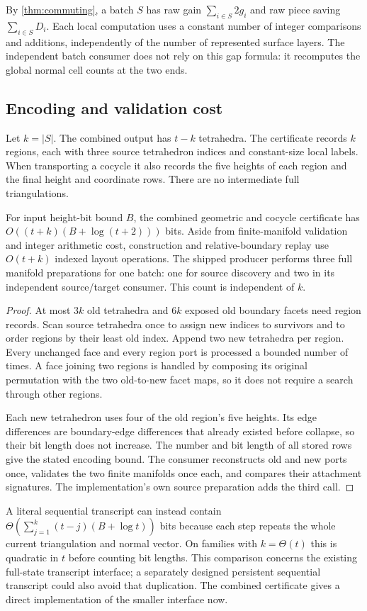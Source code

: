 By \cref{thm:commuting}, a batch $S$ has raw gain
$\sum_{i\in S}2g_i$ and raw piece saving $\sum_{i\in S}D_i$.
Each local computation uses a constant number of integer comparisons
and additions, independently of the number of represented surface
layers. The independent batch consumer does not rely on this gap
formula: it recomputes the global normal cell counts at the two ends.

\subsection{Encoding and validation cost}

Let $k=|S|$. The combined output has $t-k$ tetrahedra. The certificate
records $k$ regions, each with three source tetrahedron indices and
constant-size local labels. When transporting a cocycle it also records
the five heights of each region and the final height and coordinate
rows. There are no intermediate full triangulations.

\begin{proposition}
\label{prop:batch-cost}
For input height-bit bound $B$, the combined geometric and cocycle
certificate has $O((t+k)(B+\log(t+2)))$ bits. Aside from finite-manifold
validation and integer arithmetic cost, construction and relative-boundary
replay use $O(t+k)$ indexed layout operations. The shipped producer
performs three full manifold preparations for one batch: one for source
discovery and two in its independent source/target consumer. This count
is independent of $k$.
\end{proposition}
\begin{proof}
At most $3k$ old tetrahedra and $6k$ exposed old boundary facets need
region records. Scan source tetrahedra once to assign new indices to
survivors and to order regions by their least old index. Append two new
tetrahedra per region. Every unchanged face and every region port is
processed a bounded number of times. A face joining two regions is
handled by composing its original permutation with the two old-to-new
facet maps, so it does not require a search through other regions.

Each new tetrahedron uses four of the old region's five heights. Its
edge differences are boundary-edge differences that already existed
before collapse, so their bit length does not increase. The number
and bit length of all stored rows give the stated encoding bound.
The consumer reconstructs old and new ports once, validates the two
finite manifolds once each, and compares their attachment signatures.
The implementation's own source preparation adds the third call.
\end{proof}

A literal sequential transcript can instead contain
$\Theta(\sum_{j=1}^{k}(t-j)(B+\log t))$ bits because each step repeats the
whole current triangulation and normal vector. On families with
$k=\Theta(t)$ this is quadratic in $t$ before counting bit lengths.
This comparison concerns the existing full-state transcript interface;
a separately designed persistent sequential transcript could also avoid
that duplication. The combined certificate gives a direct implementation
of the smaller interface now.
